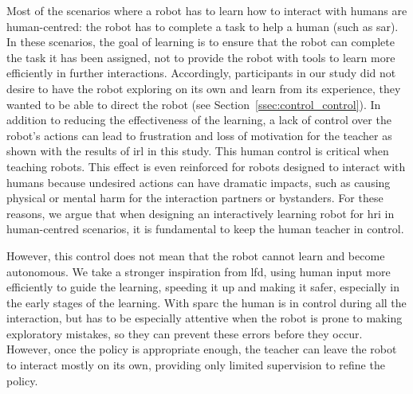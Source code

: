 Most of the scenarios where a robot has to learn how to interact with humans are human-centred: the robot has to complete a task to help a human (such as \gls{sar}). In these scenarios, the goal of learning is to ensure that the robot can complete the task it has been assigned, not to provide the robot with tools to learn more efficiently in further interactions. Accordingly, participants in our study did not desire to have the robot exploring on its own and learn from its experience, they wanted to be able to direct the robot (see Section~\ref{ssec:control_control}). In addition to reducing the effectiveness of the learning, a lack of control over the robot's actions can lead to frustration and loss of motivation for the teacher as shown with the results of \gls{irl} in this study. This human control is critical when teaching robots. This effect is even reinforced for robots designed to interact with humans because undesired actions can have dramatic impacts, such as causing physical or mental harm for the interaction partners or bystanders. For these reasons, we argue that when designing an interactively learning robot for \gls{hri} in human-centred scenarios, it is fundamental to keep the human teacher in control. 

However, this control does not mean that the robot cannot learn and become autonomous. We take a stronger inspiration from \gls{lfd}, using human input more efficiently to guide the learning, speeding it up and making it safer, especially in the early stages of the learning. With \gls{sparc} the human is in control during all  the interaction, but has to be especially attentive when the robot is prone to making exploratory mistakes, so they can prevent these errors before they occur. However, once the policy is appropriate enough, the teacher can leave the robot to interact mostly on its own, providing only limited supervision to refine the policy.


